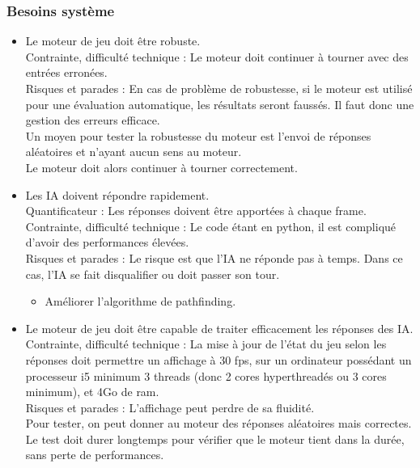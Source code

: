 \subsubsection{Besoins système}
    \begin{itemize}
        \item Le moteur de jeu doit être robuste. \\
            Contrainte, difficulté technique : Le moteur doit continuer à tourner avec des entrées erronées. \\
            Risques et parades : En cas de problème de robustesse, si le moteur est utilisé pour une évaluation automatique, les résultats seront faussés. Il faut donc une gestion des erreurs efficace.\\
            Un moyen pour tester la robustesse du moteur est l'envoi de réponses aléatoires et n'ayant aucun sens au moteur.\\
            Le moteur doit alors continuer à tourner correctement.\\

        \item Les IA doivent répondre rapidement.\\
            Quantificateur : Les réponses doivent être apportées à chaque frame.\\
            Contrainte, difficulté technique : Le code étant en python, il est compliqué d'avoir des performances élevées.\\
            Risques et parades : Le risque est que l'IA ne réponde pas à temps. Dans ce cas, l'IA se fait disqualifier ou doit passer son tour.\\
            \begin{itemize}
                \item Améliorer l'algorithme de pathfinding.
            \end{itemize}
        
        \item Le moteur de jeu doit être capable de traiter efficacement les réponses des IA.\\
            Contrainte, difficulté technique :  La mise à jour de l'état du jeu selon les réponses doit permettre un affichage à 30 fps, sur un ordinateur possédant un processeur i5 minimum 3 threads (donc 2 cores hyperthreadés ou 3 cores minimum), et 4Go de ram.\\
            Risques et parades : L'affichage peut perdre de sa fluidité.\\
            Pour tester, on peut donner au moteur des réponses aléatoires mais correctes. Le test doit durer longtemps pour vérifier que le moteur tient dans la durée, sans perte de performances.\\
        
    \end{itemize}
    
